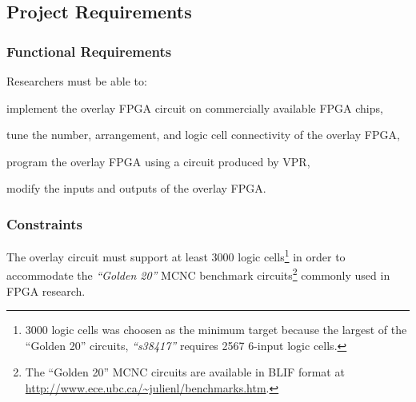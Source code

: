 \subsection{Project Requirements}

%


\subsubsection{Functional Requirements}

Researchers must be able to:
\begin{itemlist}
	\item implement the overlay FPGA circuit on commercially available FPGA chips,
	\item tune the number, arrangement, and logic cell connectivity of the overlay FPGA,
	\item program the overlay FPGA using a circuit produced by VPR,
	\item modify the inputs and outputs of the overlay FPGA.
\end{itemlist}


\subsubsection{Constraints}

\begin{itemlist}
	\item The overlay circuit must support at least 3000 logic cells\footnote{3000 logic cells was choosen as the minimum target because the largest of the ``Golden 20'' circuits, \emph{``s38417''} requires 2567 6-input logic cells\cite{synthesis-density}.} in order to accommodate the \emph{``Golden 20''} MCNC benchmark circuits\footnote{The ``Golden 20'' MCNC circuits are available in BLIF format at \url{http://www.ece.ubc.ca/~julienl/benchmarks.htm}.} commonly used in FPGA research.
\end{itemlist}



